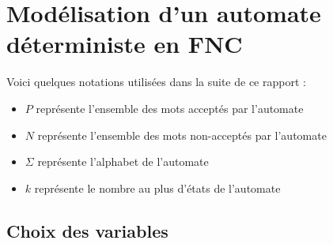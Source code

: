 \documentclass[a4paper, 12pt]{extarticle}
\begin{document}


\makemargins %
\makefrontpage
\maketoc



% 


\section{Modélisation d'un automate déterministe en FNC } 
\label{sec:modelisation_d_automates_en_fnc_}


Voici quelques notations utilisées dans la suite de ce rapport : 
\begin{itemize}[label=$\bullet$]
    \item $P$ représente l'ensemble des mots acceptés par l'automate 
    \item $N$ représente l'ensemble des mots non-acceptés par l'automate 
    \item $\Sigma$ représente l'alphabet de l'automate 
    \item $k$ représente le nombre au plus d'états de l'automate
\end{itemize}

\subsection{Choix des variables}
\label{sub:choix_des_variables}
\end{document}
